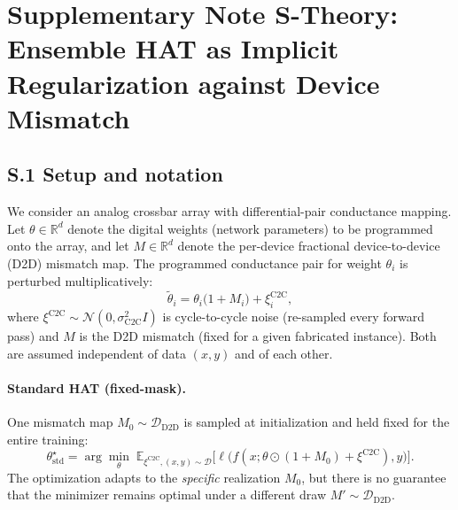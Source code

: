 
\section*{Supplementary Note S-Theory: Ensemble HAT as Implicit Regularization against Device Mismatch}
\label{supp:theory-ensemble-hat}

\subsection*{S.1 Setup and notation}

We consider an analog crossbar array with differential-pair conductance mapping. Let $\theta \in \mathbb{R}^d$ denote the digital weights (network parameters) to be programmed onto the array, and let $M \in \mathbb{R}^d$ denote the per-device fractional device-to-device (D2D) mismatch map. The programmed conductance pair for weight $\theta_i$ is perturbed multiplicatively:
\begin{equation}
    \tilde{\theta}_i = \theta_i \bigl(1 + M_i\bigr) + \xi_i^{\text{C2C}},
    \label{eq:weight-perturbation}
\end{equation}
where $\xi^{\text{C2C}} \sim \mathcal{N}(0, \sigma_{\text{C2C}}^2 I)$ is cycle-to-cycle noise (re-sampled every forward pass) and $M$ is the D2D mismatch (fixed for a given fabricated instance). Both are assumed independent of data $(x,y)$ and of each other.

\paragraph{Standard HAT (fixed-mask).} One mismatch map $M_0 \sim \mathcal{D}_{\text{D2D}}$ is sampled at initialization and held fixed for the entire training:
\begin{equation}
    \theta_{\text{std}}^{\star} = \arg\min_{\theta} \; \mathbb{E}_{\xi^{\text{C2C}}, (x,y) \sim \mathcal{D}} \bigl[ \ell\bigl(f(x; \theta \odot (1+M_0) + \xi^{\text{C2C}}), y\bigr) \bigr].
    \label{eq:standard-hat-objective}
\end{equation}
The optimization adapts to the \emph{specific} realization $M_0$, but there is no guarantee that the minimizer remains optimal under a different draw $M' \sim \mathcal{D}_{\text{D2D}}$.

